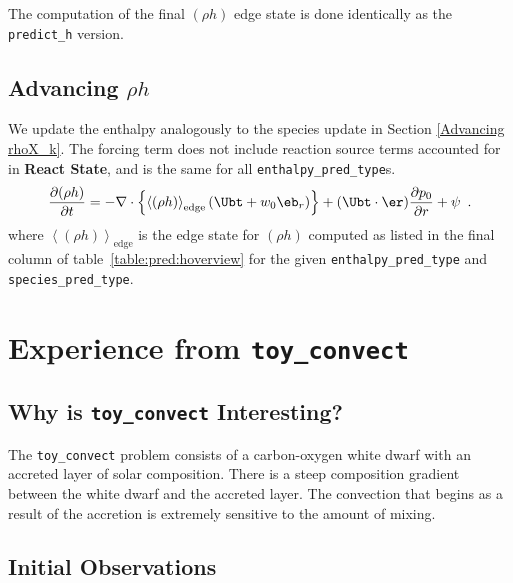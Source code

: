 The computation of the final $(\rho h)$ edge state is done identically
as the {\tt predict\_h} version.



\subsection{Advancing $\rho h$}
We update the enthalpy analogously to the species update in 
Section \ref{Advancing rhoX_k}.  The forcing term does not include reaction
source terms accounted for in {\bf React State}, and is the same
for all {\tt enthalpy\_pred\_type}s.
\begin{equation}
\frac{\partial(\rho h)}{\partial t} = 
-\nabla\cdot\left\{\left \langle (\rho h) \right \rangle_\mathrm{edge}
 \left(\Ubt + w_0\eb_r\right)\right\} + (\Ubt \cdot \er)\frac{\partial p_0}{\partial r} + \psi  \enskip .
\end{equation}
where $\left \langle (\rho h) \right \rangle_\mathrm{edge}$ is the
edge state for $(\rho h)$ computed as listed in the final column of
table~\ref{table:pred:hoverview} for the given {\tt enthalpy\_pred\_type}
and {\tt species\_pred\_type}.




\section{Experience from {\tt toy\_convect}}

\label{sec:toyconvect}

\subsection{Why is {\tt toy\_convect} Interesting?}

The {\tt toy\_convect} problem consists of a carbon-oxygen white dwarf with 
an accreted layer of solar composition. There is a steep composition 
gradient between the white dwarf and the accreted layer. The convection 
that begins as a result of the accretion is extremely sensitive to the 
amount of mixing.

\subsection{Initial Observations}


